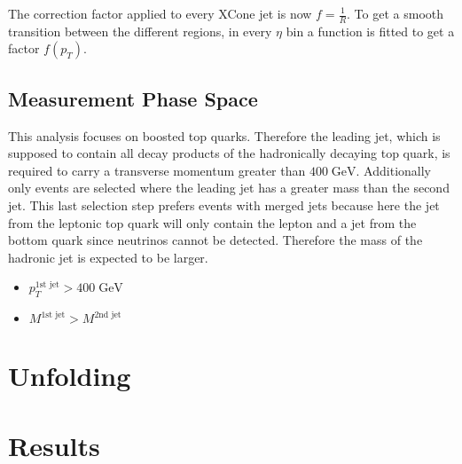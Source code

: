 	The correction factor applied to every XCone jet is now $f = \frac{1}{R}$. To get a smooth transition between the different regions, in every $\eta$ bin a function is fitted to get a factor $f(p_T)$.
\subsection{Measurement Phase Space}
\label{sec:FinalSel}
	This analysis focuses on boosted top quarks. Therefore the leading jet, which is supposed to contain all decay products of the hadronically decaying top quark, is required to carry a transverse momentum greater than $400\;\text{GeV}$. Additionally only events are selected where the leading jet has a greater mass than the second jet. This last selection step prefers events with merged jets because here the jet from the leptonic top quark will only contain the lepton and a jet from the bottom quark since neutrinos cannot be detected. Therefore the mass of the hadronic jet is expected to be larger.
	\begin{itemize}
	\item $p_T^{\text{1st jet}} > 400\;\text{GeV}$ 
	\item $M^{\text{1st jet}} > M^{\text{2nd jet}}$
	\end{itemize}

\section{Unfolding}
\section{Results}
\label{sec:results}
